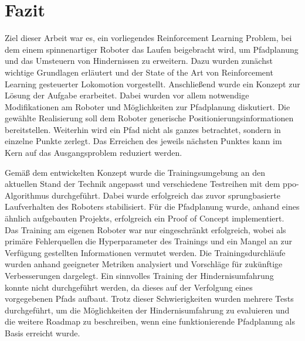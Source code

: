 \chapter{Fazit}
Ziel dieser Arbeit war es, ein vorliegendes Reinforcement Learning Problem, bei dem einem spinnenartiger Roboter das Laufen beigebracht wird, um Pfadplanung und das Umsteuern von Hindernissen zu erweitern.
Dazu wurden zunächst wichtige Grundlagen erläutert und der State of the Art von Reinforcement Learning gesteuerter Lokomotion vorgestellt.
Anschließend wurde ein Konzept zur Lösung der Aufgabe erarbeitet.
Dabei wurden vor allem notwendige Modifikationen am Roboter und Möglichkeiten zur Pfadplanung diskutiert.
Die gewählte Realisierung soll dem Roboter generische Positionierungsinformationen bereitstellen.
Weiterhin wird ein Pfad nicht als ganzes betrachtet, sondern in einzelne Punkte zerlegt.
Das Erreichen des jeweils nächsten Punktes kann im Kern auf das Ausgangsproblem reduziert werden.

Gemäß dem entwickelten Konzept wurde die Trainingsumgebung an den aktuellen Stand der Technik angepasst und verschiedene Testreihen mit dem \acl{ppo}-Algorithmus durchgeführt.
Dabei wurde erfolgreich das zuvor sprungbasierte Laufverhalten des Roboters stabilisiert.
Für die Pfadplanung wurde, anhand eines ähnlich aufgebauten Projekts, erfolgreich ein Proof of Concept implementiert.
Das Training am eigenen Roboter war nur eingeschränkt erfolgreich, wobei als primäre Fehlerquellen die Hyperparameter des Trainings und ein Mangel an zur Verfügung gestellten Informationen vermutet werden.
Die Trainingsdurchläufe wurden anhand geeigneter Metriken analysiert und Vorschläge für zukünftige Verbesserungen dargelegt.
Ein sinnvolles Training der Hindernisumfahrung konnte nicht durchgeführt werden, da dieses auf der Verfolgung eines vorgegebenen Pfads aufbaut.
Trotz dieser Schwierigkeiten wurden mehrere Tests durchgeführt, um die Möglichkeiten der Hindernisumfahrung zu evaluieren und die weitere Roadmap zu beschreiben, wenn eine funktionierende Pfadplanung als Basis erreicht wurde.